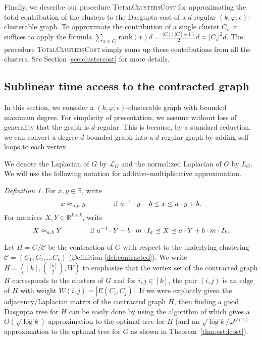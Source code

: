 \documentclass[letterpaper,11pt]{article}
\newcommand{\rank}{\mathrm{rank}}
\newcommand{\cC}{\mathcal{C}}
\newcommand{\cL}{\mathcal{L}}
\theoremstyle{plain}
\theoremstyle{definition}
\theoremstyle{remark}
\newtheorem{mydef}{Definition}
\begin{document}
Finally, we describe our procedure \textsc{TotalClustersCost} for approximating the total contribution of the clusters to the Dasgupta cost of a $d$-regular $(k,\varphi, \epsilon)$-clusterable graph. To approximate the contribution of a single cluster $C_i$, it suffices to apply the formula $ \sum_{x \in C_i} \rank(x) d = \frac{|C_i|(|C_i|+1)}{2}d \approx |C_i|^2d.$ The procedure \textsc{TotalClustersCost} simply sums up these contributions from all the clusters. See Section \ref{sec:clustercost} for more details. 

\subsection{Sublinear time access to the contracted graph} \label{sec:overview}
In this section, we consider a $(k,\varphi, \epsilon)$-clusterable graph with bounded maximum degree. For simplicity of presentation, we assume without loss of generality that the graph is $d$-regular. This is because, by a standard reduction, we can convert a degree $d$-bounded graph into a $d$-regular graph by adding self-loops to each vertex.

We denote the Laplacian of $G$ by $\cL_G$ and the normalized Laplacian of $G$ by $L_G$. 
We will use the following notation for additive-multiplicative approximation.
\begin{mydef}
For $x,y \in \mathbb{R}$, write 
$$x \approx_{a,b} y \text{\qquad \qquad if }a^{-1}\cdot y - b \leq x \leq a \cdot y+b.$$
For matrices $X,Y \in \mathbb{R}^{k \times k}$, write
$$X \approx_{a,b} Y \text{\qquad \qquad if }a^{-1}\cdot Y - b\cdot m \cdot I_k \preceq X \preceq a \cdot  Y+b\cdot m \cdot I_k.$$
\end{mydef}
Let $H = G/\cC$ be the contraction of $G$ with respect to the underlying clustering $\cC= (C_1, C_2, \ldots C_k)$ (Definition \ref{def:contracted}). We write $H = ([k], \binom{[k]}{2},W)$ to emphasize that the vertex set of the contracted graph $H$ corresponds 
to the clusters of $G$ and for $i,j \in [k]$, the pair $(i,j)$ is an edge of $H$ with weight
$W(i,j) = |E(C_i, C_j)|$. If we were explicitly given the adjacency/Laplacian matrix
of the contracted graph $H$, then finding a good Dasgupta tree for $H$ can be easily done by using
the algorithm of \cite{charikar2017approximate} which gives a $O(\sqrt{\log k})$
approximation to the optimal tree for $H$ (and an $\sqrt{\log k}/\varphi^{O(1)}$ approximation
to the optimal tree for $G$ as shown in Theorem~\ref{thm:estdcost}).
\end{document}
